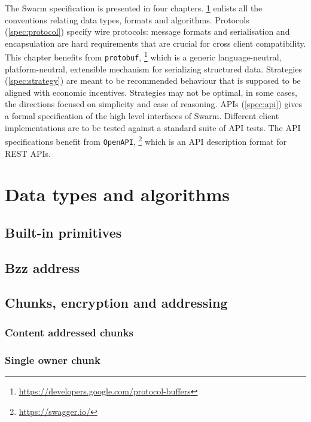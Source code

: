 
The Swarm specification is presented in four chapters. \ref{spec:convention} enlists all the conventions relating data types, formats and algorithms. Protocols 
(\ref{spec:protocol}) specify wire protocols: message formats and serialisation and encapsulation are hard requirements that are crucial for  cross client compatibility. This chapter benefits from \lstinline{protobuf},%
%
\footnote{\url{https://developers.google.com/protocol-buffers}}
%
which is a generic language-neutral, platform-neutral, extensible mechanism for serializing structured data.
Strategies (\ref{spec:strategy}) are meant to be recommended  behaviour that is supposed to be aligned with economic incentives.
Strategies may not be optimal, in some cases, the directions focused on simplicity and ease of reasoning.
APIs (\ref{spec:api}) gives a formal specification of the high level interfaces of Swarm. Different client implementations are  to be tested against a standard suite of API tests. The API specifications benefit from \lstinline{OpenAPI},%
%
\footnote{\url{https://swagger.io/}}
%
which is an API description format for REST APIs.


\chapter{Data types and algorithms}\label{spec:convention}

\orange{}

\section{Built-in primitives \statusyellow}\label{spec:format:builtin}


\section{Bzz address}\label{spec:format:bzzaddress}


\section{Chunks, encryption and addressing}
\subsection{Content addressed chunks \statusyellow}\label{spec:format:chunks}

\subsection{Single owner chunk \statusyellow}\label{spec:format:soc}

